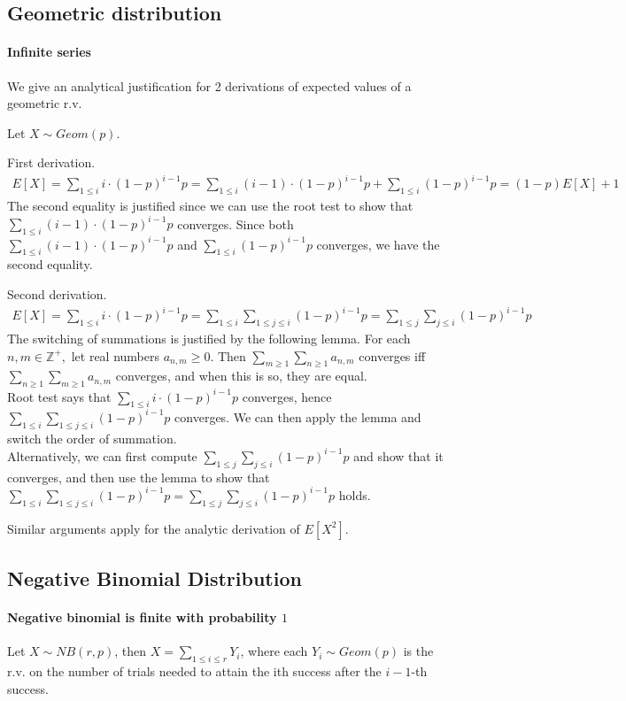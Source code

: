 \documentclass{article}
\begin{document}
\subsection{Geometric distribution}
\paragraph{Infinite series} We give an analytical justification for 2 derivations of expected values of a geometric r.v.

Let $X\sim Geom(p)$.

First derivation.
\begin{align*}
	E[X] = \sum_{1\leq i}i\cdot (1-p)^{i-1}p = \sum_{1\leq i}(i-1)\cdot (1-p)^{i-1}p + \sum_{1\leq i}(1-p)^{i-1}p = (1-p)E[X] + 1
\end{align*}
The second equality is justified since we can use the root test to show that $\sum_{1\leq i}(i-1)\cdot (1-p)^{i-1}p$ converges. Since both $\sum_{1\leq i}(i-1)\cdot (1-p)^{i-1}p$ and $\sum_{1\leq i}(1-p)^{i-1}p$ converges, we have the second equality.

Second derivation.
\begin{align*}
	E[X] = \sum_{1\leq i}i\cdot (1-p)^{i-1}p = \sum_{1\leq i}\sum_{1\leq j\leq i}(1-p)^{i-1}p = \sum_{1\leq j}\sum_{j\leq i}(1-p)^{i-1}p
\end{align*}
The switching of summations is justified by the following lemma. For each $n,m \in \mathbb{Z}^+,$ let real numbers $a_{n,m}\geq 0$. Then $\sum_{m\geq 1}\sum_{n\geq 1}a_{n,m}$ converges iff $\sum_{n\geq 1}\sum_{m\geq 1}a_{n,m}$ converges, and when this is so, they are equal.\\
Root test says that $\sum_{1\leq i}i\cdot (1-p)^{i-1}p$ converges, hence $\sum_{1\leq i}\sum_{1\leq j\leq i}(1-p)^{i-1}p$ converges. We can then apply the lemma and switch the order of summation.\\
Alternatively, we can first compute $\sum_{1\leq j}\sum_{j\leq i}(1-p)^{i-1}p$ and show that it converges, and then use the lemma to show that $\sum_{1\leq i}\sum_{1\leq j\leq i}(1-p)^{i-1}p = \sum_{1\leq j}\sum_{j\leq i}(1-p)^{i-1}p$ holds.

Similar arguments apply for the analytic derivation of $E[X^2]$.

\subsection{Negative Binomial Distribution}
\paragraph{Negative binomial is finite with probability $1$}
Let $X\sim NB(r, p)$, then $X = \sum_{1\leq i\leq r}Y_i$, where each $Y_i\sim Geom(p)$ is the r.v. on the number of trials needed to attain the ith success after the $i-1$-th success.
\end{document}
